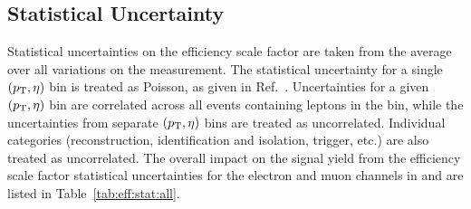 \subsection{Statistical Uncertainty}
Statistical uncertainties on the efficiency scale factor are taken from the average over all variations on the measurement. The statistical uncertainty for a single $(p_{\mathrm{T}},\eta)$ bin is treated as Poisson, as given in Ref.~\cite{Paterno:2004cb}. Uncertainties for a given $(p_{\mathrm{T}},\eta)$ bin are correlated across all events containing leptons in the bin, while the uncertainties from separate $(p_{\mathrm{T}},\eta)$ bins are treated as uncorrelated. Individual categories (reconstruction, identification and isolation, trigger, etc.) are also treated as uncorrelated. The overall impact on the signal yield from the efficiency scale factor statistical uncertainties for the electron and muon channels in \serag and \serah are listed in Table~\ref{tab:eff:stat:all}.


% 
% 
% 
% 
% 
% 



